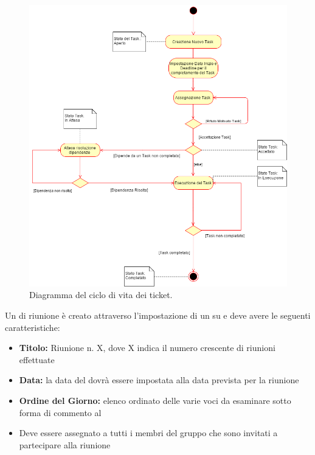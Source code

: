 \documentclass[12pt,a4paper]{article}
\begin{document}
\begin{center}
	\begin{figure}[H]
		\centering
		\label{f2-TicketCicloVita}
		\includegraphics[scale=0.6]{../img/ticketCicloVita.png}
		\caption{Diagramma del ciclo di vita dei ticket.}
	\end{figure}
\end{center}

\label{ticketRiunione}
Un  di riunione è creato attraverso l'impostazione di un  su  e deve avere le seguenti caratteristiche:
\begin{itemize}
	\item \textbf{Titolo:} Riunione n. X, dove X indica il numero crescente di riunioni effettuate
	\item \textbf{Data:} la data del  dovrà essere impostata alla data prevista per la riunione
	\item \textbf{Ordine del Giorno:} elenco ordinato delle varie voci da esaminare sotto forma di commento al 
	\item Deve essere assegnato a tutti i membri del gruppo che sono invitati a partecipare alla riunione
\end{itemize}
\end{document}

